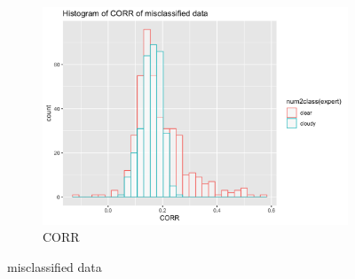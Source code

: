 \documentclass[jou]{apa}%
\begin{document}
\begin{figure}[H]
\begin{subfigure}{0.4\columnwidth}
    \includegraphics[scale=.1]{CORRmis}
    \caption{CORR}
    \label{fig:2}
  \end{subfigure}
 \caption{misclassified data}
\end{figure}

\end{document}
